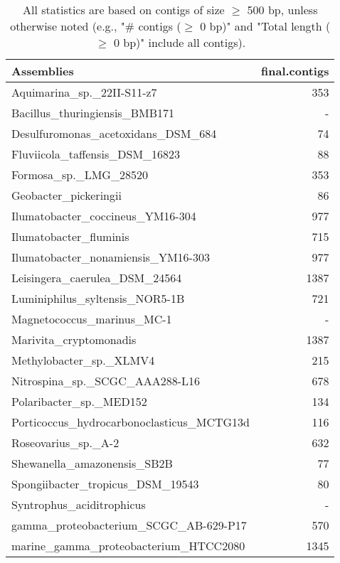 \documentclass[12pt,a4paper]{article}
\begin{document}
\begin{table}[ht]
\begin{center}
\caption{All statistics are based on contigs of size $\geq$ 500 bp, unless otherwise noted (e.g., "\# contigs ($\geq$ 0 bp)" and "Total length ($\geq$ 0 bp)" include all contigs).}
\begin{tabular}{|l*{1}{|r}|}
\hline
Assemblies & final.contigs \\ \hline
Aquimarina\_sp.\_22II-S11-z7 & 353 \\ \hline
Bacillus\_thuringiensis\_BMB171 & - \\ \hline
Desulfuromonas\_acetoxidans\_DSM\_684 & 74 \\ \hline
Fluviicola\_taffensis\_DSM\_16823 & 88 \\ \hline
Formosa\_sp.\_LMG\_28520 & 353 \\ \hline
Geobacter\_pickeringii & 86 \\ \hline
Ilumatobacter\_coccineus\_YM16-304 & 977 \\ \hline
Ilumatobacter\_fluminis & 715 \\ \hline
Ilumatobacter\_nonamiensis\_YM16-303 & 977 \\ \hline
Leisingera\_caerulea\_DSM\_24564 & 1387 \\ \hline
Luminiphilus\_syltensis\_NOR5-1B & 721 \\ \hline
Magnetococcus\_marinus\_MC-1 & - \\ \hline
Marivita\_cryptomonadis & 1387 \\ \hline
Methylobacter\_sp.\_XLMV4 & 215 \\ \hline
Nitrospina\_sp.\_SCGC\_AAA288-L16 & 678 \\ \hline
Polaribacter\_sp.\_MED152 & 134 \\ \hline
Porticoccus\_hydrocarbonoclasticus\_MCTG13d & 116 \\ \hline
Roseovarius\_sp.\_A-2 & 632 \\ \hline
Shewanella\_amazonensis\_SB2B & 77 \\ \hline
Spongiibacter\_tropicus\_DSM\_19543 & 80 \\ \hline
Syntrophus\_aciditrophicus & - \\ \hline
gamma\_proteobacterium\_SCGC\_AB-629-P17 & 570 \\ \hline
marine\_gamma\_proteobacterium\_HTCC2080 & 1345 \\ \hline
\end{tabular}
\end{center}
\end{table}
\end{document}
